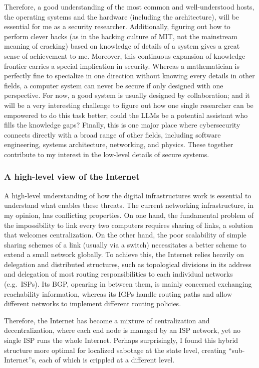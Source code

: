 \documentclass[10pt]{article}
\begin{document}
Therefore, a good understanding of the most common and well-understood hosts,
the operating systems and the hardware (including the architecture), will be
essential for me as a security researcher. Additionally, figuring out how to
perform clever hacks (as in the hacking culture of MIT, not the mainstream
meaning of cracking) based on knowledge of details of a system gives a great
sense of achievement to me. Moreover, this continuous expansion of knowledge
frontier carries a special implication in security. Whereas a mathematician is
perfectly fine to specialize in one direction without knowing every details in
other fields, a computer system can never be secure if only designed with one
perspective. For now, a good system is usually designed by collaboration; and
it will be a very interesting challenge to figure out how one single researcher
can be empowered to do this task better; could the LLMs be a potential
assistant who fills the knowledge gaps? Finally, this is one major place where
cybersecurity connects directly with a broad range of other fields, including
software engineering, systems architecture, networking, and physics.  These
together contribute to my interest in the low-level details of secure systems.

\subsubsection{A high-level view of the Internet}
A high-level understanding of how the digital infrastructures work is essential
to understand what enables these threats. The current networking infrastructure,
in my opinion, has conflicting properties. On one hand, the fundamental problem
of the impossibility to link every two computers requires sharing of links, a
solution that welcomes centralization. On the other hand, the poor scalability
of simple sharing schemes of a link (usually via a switch) necessitates a
better scheme to extend a small network globally. To achieve this, the Internet
relies heavily on delegation and distributed structures, such as topological
divisions in its address and delegation of most routing responsibilities to
each individual networks (e.g.\ ISPs). Its BGP, opearing in between them, is
mainly concerned exchanging reachability information, whereas its IGPs handle
routing paths and allow different networks to implement different routing
policies.

Therefore, the Internet has become a mixture of centralization and
decentralization, where each end node is managed by an ISP network, yet no
single ISP runs the whole Internet. Perhaps surprisingly, I found this hybrid
structure more optimal for localized sabotage at the state level, creating
``sub-Internet''s, each of which is crippled at a different level. 
\end{document}
